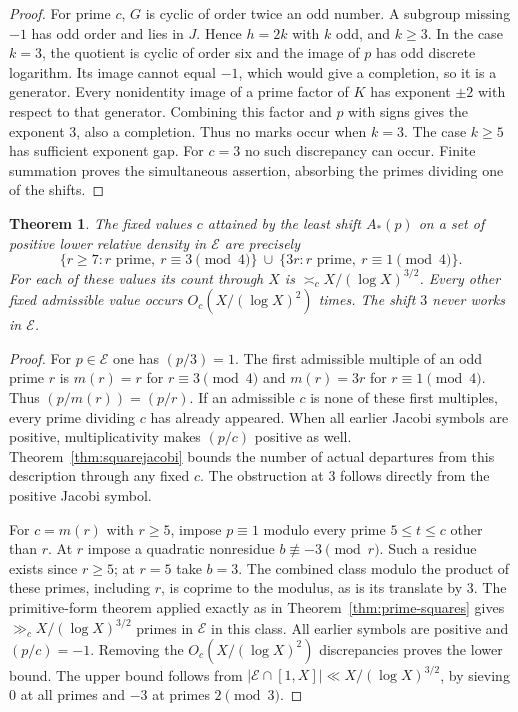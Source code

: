 \documentclass[a4paper,11pt]{article}
\newtheorem{theorem}{Theorem}[section]
\theoremstyle{definition}\newtheorem{question}[theorem]{Question}
\begin{document}
\begin{proof}
For prime $c$, $G$ is cyclic of order twice an odd number. A subgroup
missing $-1$ has odd order and lies in $J$. Hence $h=2k$ with $k$
odd, and $k\ge3$. In the case $k=3$, the quotient is cyclic of order
six and the image of $p$ has odd discrete logarithm. Its image cannot
equal $-1$, which would give a completion, so it is a generator.
Every nonidentity image of a prime factor of $K$ has exponent
$\pm2$ with respect to that generator. Combining this factor and $p$
with signs gives the exponent $3$, also a completion. Thus no marks
occur when $k=3$. The case $k\ge5$ has sufficient exponent gap.
For $c=3$ no such discrepancy can occur. Finite summation proves the
simultaneous assertion, absorbing the primes dividing one of the shifts.
\end{proof}

\begin{theorem}\label{thm:squarespectrum}
The fixed values $c$ attained by the least shift $A_*(p)$ on a set
of positive lower relative density in $\mathcal E$ are precisely
\[
 \{r\ge7:r\text{ prime},\ r\equiv3\pmod4\}
 \ \cup\ \{3r:r\text{ prime},\ r\equiv1\pmod4\}.
\]
For each of these values its count through $X$ is
$\asymp_c X/(\log X)^{3/2}$. Every other fixed admissible value
occurs $O_c(X/(\log X)^2)$ times. The shift $3$ never works in
$\mathcal E$.
\end{theorem}

\begin{proof}
For $p\in\mathcal E$ one has $(p/3)=1$. The first admissible
multiple of an odd prime $r$ is $m(r)=r$ for $r\equiv3\pmod4$ and
$m(r)=3r$ for $r\equiv1\pmod4$. Thus $(p/m(r))=(p/r)$.
If an admissible $c$ is none of these first multiples, every prime
dividing $c$ has already appeared. When all earlier Jacobi symbols
are positive, multiplicativity makes $(p/c)$ positive as well.
Theorem~\ref{thm:squarejacobi} bounds the number of actual departures
from this description through any fixed $c$. The obstruction at $3$
follows directly from the positive Jacobi symbol.

For $c=m(r)$ with $r\ge5$, impose $p\equiv1$ modulo every prime
$5\le t\le c$ other than $r$. At $r$ impose a quadratic nonresidue
$b\not\equiv-3\pmod r$. Such a residue exists since $r\ge5$; at
$r=5$ take $b=3$. The combined class modulo the product of these
primes, including $r$, is coprime to the modulus, as is its translate
by $3$. The primitive-form theorem applied exactly as in
Theorem~\ref{thm:prime-squares} gives
$\gg_c X/(\log X)^{3/2}$ primes in $\mathcal E$ in this class.
All earlier symbols are positive and $(p/c)=-1$. Removing the
$O_c(X/(\log X)^2)$ discrepancies proves the lower bound. The upper
bound follows from $|\mathcal E\cap[1,X]|\ll X/(\log X)^{3/2}$,
by sieving $0$ at all primes and $-3$ at primes $2\pmod3$.
\end{proof}
\end{document}
